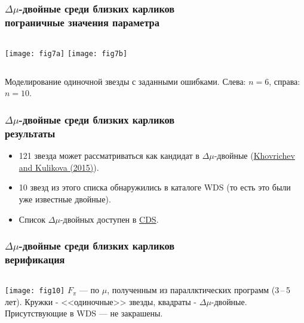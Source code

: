 \begin{frame}
\frametitle{$\Delta\mu$-двойные среди близких карликов\\{\small пограничные значения параметра}}
\begin{center}
\begin{columns}
	\texttt{[image: fig7a]}
	\texttt{[image: fig7b]}
\end{columns}
\end{center}
{\footnotesize Моделирование одиночной звезды с заданными ошибками. Слева: $n=6$, справа: $n=10$.}
\end{frame}

\begin{frame}
\frametitle{$\Delta\mu$-двойные среди близких карликов\\{\small результаты}}
\begin{itemize}
\item 121 звезда может рассматриваться как кандидат в $\Delta\mu$-двойные (\href{https://ui.adsabs.harvard.edu/abs/2015AstL...41..833K/abstract}{Khovrichev and Kulikova (2015)}).
\item 10 звезд из этого списка обнаружились в каталоге WDS (то есть это были уже известные двойные).
\item Список $\Delta\mu$-двойных доступен в \href{http://vizier.u-strasbg.fr/viz-bin/VizieR-3?-source=J/PAZh/41/896/lpmsm15b}{CDS}.
\end{itemize}
\end{frame}

\begin{frame}
\frametitle{$\Delta\mu$-двойные среди близких карликов\\{\small верификация}}
\begin{columns}
	\texttt{[image: fig10]}
	{\footnotesize
		$F_{\pi}$ --- по $\mu$, полученным из параллктических программ (3\,--\,5 лет). Кружки - <<одиночные>> звезды, квадраты - $\Delta\mu$-двойные. Присутствующие в WDS --- не закрашены.
	}
\end{columns}
\end{frame}



